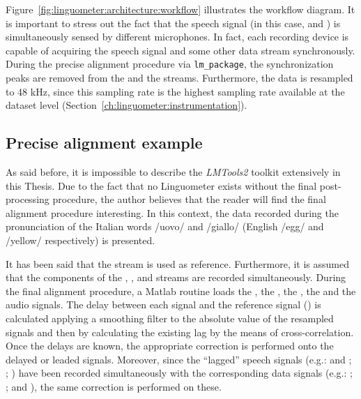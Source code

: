 
Figure~\ref{fig:linguometer:architecture:workflow} illustrates the workflow
diagram. It is important to stress out the fact that the speech signal (in this
case,  and ) is simultaneously sensed by different 
microphones. In fact,
each recording device is capable of acquiring 
the speech signal and some other data stream synchronously.
During the precise alignment procedure via {\tt lm\_package}, the
synchronization peaks are removed from the  and the
 streams.
Furthermore, the data is resampled to 48 kHz, since this sampling rate is the
highest sampling rate available at the dataset level
(Section~\ref{ch:linguometer:instrumentation}).

\subsection{Precise alignment example}
As said before, it is impossible to describe the \emph{LMTools2} toolkit
extensively in this Thesis.
Due to the fact that no Linguometer exists without the final post-processing 
procedure, the author believes that the reader will find the final alignment
procedure interesting.
In this context, the data recorded during the pronunciation of the Italian words
/uovo/ and /giallo/ (English /egg/ and /yellow/ respectively) is presented.


It has been said that the  stream is used as reference.
Furthermore, it is assumed that the components of the , ,
 and  streams are recorded simultaneously.
During the final alignment procedure, a Matlab routine loads the
, the , the , the  
and the  audio signals.
The delay between each signal and the reference signal () is 
calculated  applying a smoothing filter to the absolute value of the resampled
signals and then by calculating the existing lag by the means of
cross-correlation.
Once the delays are known, the appropriate correction is performed onto the
delayed or leaded signals.
Moreover, since the ``lagged'' speech signals 
(e.g.:  and ; ; )
have been recorded  simultaneously with the corresponding data signals
(e.g.: ; ;  and ), 
the same correction is performed on these.

